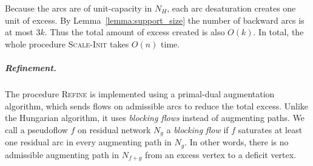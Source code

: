 \documentclass[a4paper,UKenglish]{socg-lipics-v2018}
\def\fsupply{\phi}
\theoremstyle{plain}
\numberwithin{figure}{section}
\renewcommand{\paragraph}{\subparagraph}
\def\EMPH#1{\textcolor{BrickRed}{{\emph{#1}}}}
\begin{document}
Because the arcs are of unit-capacity in $N_H$, each arc desaturation creates one unit of excess.
By Lemma~\ref{lemma:support_size} the number of backward arcs is at most $3k$.
Thus the total amount of excess created is also $O(k)$.
%
In total,
the whole procedure \textsc{Scale-Init} takes $O(n)$ time.

\paragraph{Refinement.}

The procedure \textsc{Refine} is implemented using a primal-dual augmentation algorithm,
which sends flows on admissible arcs to reduce the total excess.
Unlike the Hungarian algorithm, it uses \emph{blocking flows} instead of augmenting paths.
%
We call a pseudoflow $f$ on residual network $N_g$ a \EMPH{blocking flow} if $f$ saturates at least one residual arc in every augmenting path in $N_g$.
In other words, there is no admissible augmenting path in $N_{f+g}$ from an excess vertex to a deficit vertex.

\end{document}

